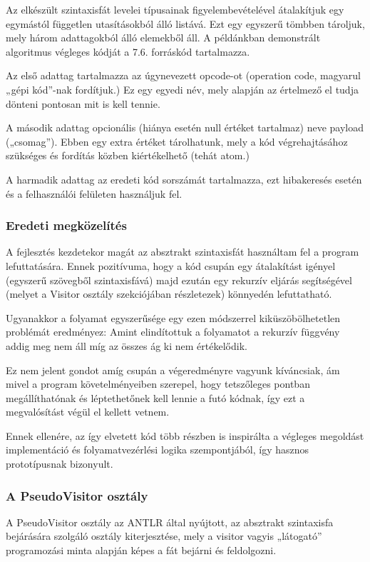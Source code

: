 Az elkészült szintaxisfát levelei típusainak figyelembevételével átalakítjuk egy egymástól független utasításokból álló listává. Ezt egy egyszerű tömbben tároljuk, mely három adattagokból álló elemekből áll. A példánkban demonstrált algoritmus végleges kódját a 7.6. forráskód tartalmazza.

Az első adattag tartalmazza az úgynevezett opcode-ot (operation code, magyarul „gépi kód”-nak fordítjuk.) Ez egy egyedi név, mely alapján az értelmező el tudja dönteni pontosan mit is kell tennie.

A második adattag opcionális (hiánya esetén null értéket tartalmaz) neve payload („csomag”). Ebben egy extra értéket tárolhatunk, mely a kód végrehajtásához szükséges és fordítás közben kiértékelhető (tehát atom.)

A harmadik adattag az eredeti kód sorszámát tartalmazza, ezt hibakeresés esetén és a felhasználói felületen használjuk fel.

\subsubsection{Eredeti megközelítés}

A fejlesztés kezdetekor magát az absztrakt szintaxisfát használtam fel a program lefuttatására. Ennek pozitívuma, hogy a kód csupán egy átalakítást igényel (egyszerű szövegből szintaxisfává) majd ezután egy rekurzív eljárás segítségével (melyet a Visitor osztály szekciójában részletezek) könnyedén lefuttatható.

Ugyanakkor a folyamat egyszerűsége egy ezen módszerrel kiküszöbölhetetlen problémát eredményez: Amint elindítottuk a folyamatot a rekurzív függvény addig meg nem áll míg az összes ág ki nem értékelődik. 

Ez nem jelent gondot amíg csupán a végeredményre vagyunk kíváncsiak, ám mivel a program követelményeiben szerepel, hogy tetszőleges pontban megállíthatónak és léptethetőnek kell lennie a futó kódnak, így ezt a megvalósítást végül el kellett vetnem.

Ennek ellenére, az így elvetett kód több részben is inspirálta a végleges megoldást implementáció és folyamatvezérlési logika szempontjából, így hasznos prototípusnak bizonyult.

\subsubsection{A PseudoVisitor osztály}

A PseudoVisitor osztály az ANTLR által nyújtott, az absztrakt szintaxisfa bejárására szolgáló osztály kiterjesztése, mely a visitor vagyis „látogató” programozási minta alapján képes a fát bejárni és feldolgozni.

